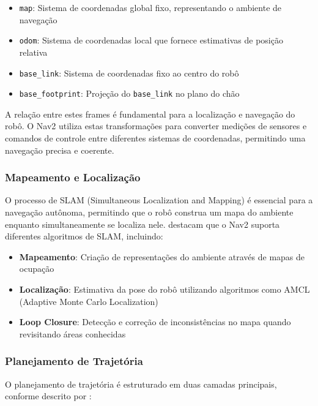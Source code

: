 \begin{itemize}
    \item \texttt{map}: Sistema de coordenadas global fixo, representando o ambiente de navegação
    \item \texttt{odom}: Sistema de coordenadas local que fornece estimativas de posição relativa
    \item \texttt{base\_link}: Sistema de coordenadas fixo ao centro do robô
    \item \texttt{base\_footprint}: Projeção do \texttt{base\_link} no plano do chão
\end{itemize}

A relação entre estes frames é fundamental para a localização e navegação do
robô. O Nav2 utiliza estas transformações para converter medições de sensores e
comandos de controle entre diferentes sistemas de coordenadas, permitindo uma
navegação precisa e coerente.

\subsubsection{Mapeamento e Localização}

O processo de SLAM (Simultaneous Localization and Mapping) é essencial para a
navegação autônoma, permitindo que o robô construa um mapa do ambiente enquanto
simultaneamente se localiza nele. \cite{Wang2020LMPC} destacam que o Nav2
suporta diferentes algoritmos de SLAM, incluindo:

\begin{itemize}
    \item \textbf{Mapeamento}: Criação de representações do ambiente através de mapas de ocupação
    \item \textbf{Localização}: Estimativa da pose do robô utilizando algoritmos como AMCL (Adaptive Monte Carlo Localization)
    \item \textbf{Loop Closure}: Detecção e correção de inconsistências no mapa quando revisitando áreas conhecidas
\end{itemize}

\subsubsection{Planejamento de Trajetória}

O planejamento de trajetória é estruturado em duas camadas principais, conforme
descrito por \cite{Karaman2011Optimal}:

